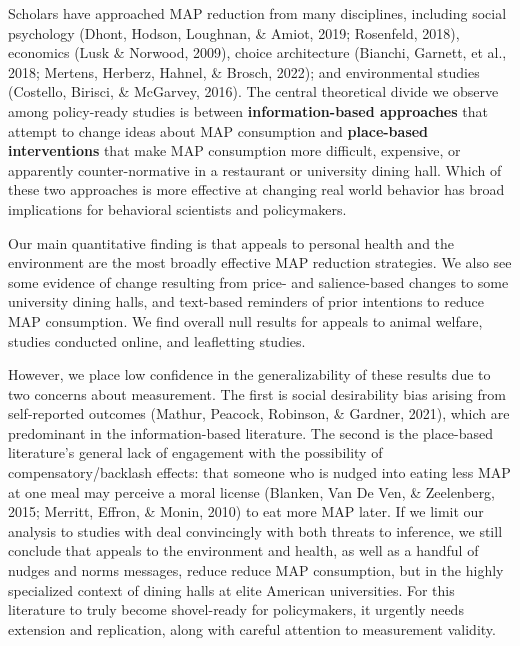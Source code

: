 \documentclass[
  man]{apa6}
\begin{document}
Scholars have approached MAP reduction from many disciplines, including social psychology (Dhont, Hodson, Loughnan, \& Amiot, 2019; Rosenfeld, 2018), economics (Lusk \& Norwood, 2009), choice architecture (Bianchi, Garnett, et al., 2018; Mertens, Herberz, Hahnel, \& Brosch, 2022); and environmental studies (Costello, Birisci, \& McGarvey, 2016). The central theoretical divide we observe among policy-ready studies is between \textbf{information-based approaches} that attempt to change ideas about MAP consumption and \textbf{place-based interventions} that make MAP consumption more difficult, expensive, or apparently counter-normative in a restaurant or university dining hall. Which of these two approaches is more effective at changing real world behavior has broad implications for behavioral scientists and policymakers.

Our main quantitative finding is that appeals to personal health and the environment are the most broadly effective MAP reduction strategies. We also see some evidence of change resulting from price- and salience-based changes to some university dining halls, and text-based reminders of prior intentions to reduce MAP consumption. We find overall null results for appeals to animal welfare, studies conducted online, and leafletting studies.

However, we place low confidence in the generalizability of these results due to two concerns about measurement. The first is social desirability bias arising from self-reported outcomes (Mathur, Peacock, Robinson, \& Gardner, 2021), which are predominant in the information-based literature. The second is the place-based literature's general lack of engagement with the possibility of compensatory/backlash effects: that someone who is nudged into eating less MAP at one meal may perceive a moral license (Blanken, Van De Ven, \& Zeelenberg, 2015; Merritt, Effron, \& Monin, 2010) to eat more MAP later. If we limit our analysis to studies with deal convincingly with both threats to inference, we still conclude that appeals to the environment and health, as well as a handful of nudges and norms messages, reduce reduce MAP consumption, but in the highly specialized context of dining halls at elite American universities. For this literature to truly become shovel-ready for policymakers, it urgently needs extension and replication, along with careful attention to measurement validity.
\end{document}
